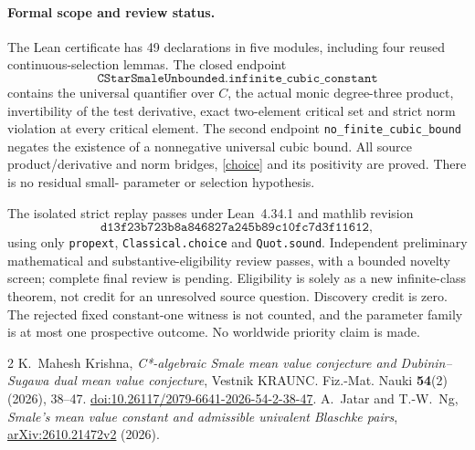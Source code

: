 \documentclass[11pt]{article}
\begin{document}
\paragraph{Formal scope and review status.}
The Lean certificate has 49 declarations in five modules, including four
reused continuous-selection lemmas. The closed endpoint
\[
\texttt{CStarSmaleUnbounded.infinite\_cubic\_constant}
\]
contains the universal quantifier over $C$, the actual monic degree-three
product, invertibility of the test derivative, exact two-element critical
set and strict norm violation at every critical element. The second endpoint
\texttt{no\_finite\_cubic\_bound} negates the existence of a nonnegative
universal cubic bound. All source product/derivative and norm bridges,
\eqref{choice} and its positivity are proved. There is no residual small-
parameter or selection hypothesis.

The isolated strict replay passes under Lean~4.34.1 and mathlib revision
\[\texttt{d13f23b723b8a846827a245b89c10fc7d3f11612},\]
using only \texttt{propext}, \texttt{Classical.choice} and \texttt{Quot.sound}.
Independent preliminary mathematical and substantive-eligibility review
passes, with a bounded novelty screen; complete final review is pending.
Eligibility is solely as a new infinite-class theorem, not credit for an
unresolved source question. Discovery credit is zero. The rejected fixed constant-one witness is not
counted, and the parameter family is at most one prospective outcome.
No worldwide priority claim is made.

\begin{thebibliography}{2}
 K.~Mahesh Krishna,
\emph{C*-algebraic Smale mean value conjecture and Dubinin--Sugawa dual mean
value conjecture}, Vestnik KRAUNC. Fiz.-Mat. Nauki \textbf{54}(2) (2026), 38--47.
\href{https://doi.org/10.26117/2079-6641-2026-54-2-38-47}{doi:10.26117/2079-6641-2026-54-2-38-47}.
 A.~Jatar and T.-W.~Ng,
\emph{Smale's mean value constant and admissible univalent Blaschke pairs},
\href{https://arxiv.org/abs/2610.21472v2}{arXiv:2610.21472v2} (2026).
\end{thebibliography}
\end{document}
